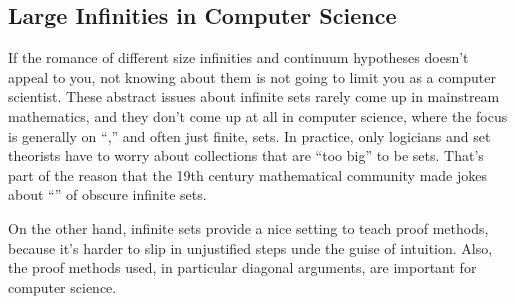 \subsection{Large Infinities in Computer Science}

If the romance of different size infinities and continuum hypotheses
doesn't appeal to you, not knowing about them is not going to limit
you as a computer scientist.  These abstract issues about infinite
sets rarely come up in mainstream mathematics, and they don't come up
at all in computer science, where the focus is generally on
``,'' and often just finite, sets.  In practice, only
logicians and set theorists have to worry about collections that are
``too big'' to be sets.  That's part of the reason that the 19th
century mathematical community made jokes about ``'' of obscure infinite sets.

On the other hand, infinite sets provide a nice setting to teach proof
methods, because it's harder to slip in unjustified steps unde the
guise of intuition.  Also, the proof methods used, in particular
diagonal arguments, are important for computer science.


\begin{problems}
\classproblems
{}

\homeworkproblems
{}
\end{problems}

\endinput
